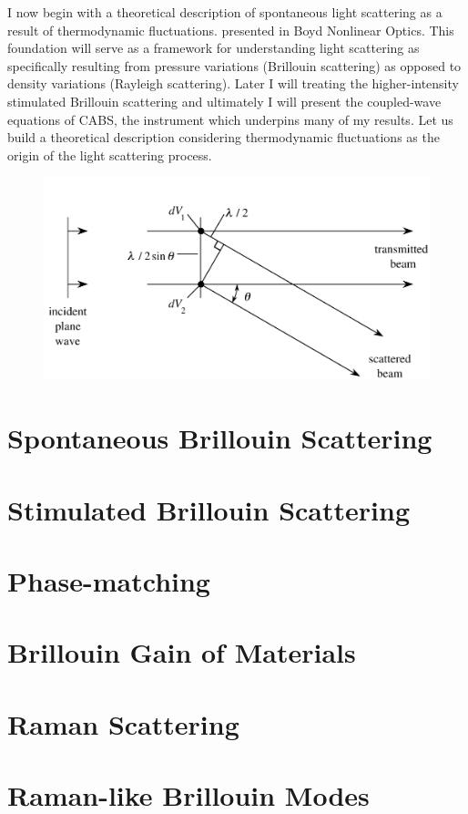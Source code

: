 I now begin with a theoretical description of spontaneous light scattering as a result of thermodynamic fluctuations.  presented in Boyd Nonlinear Optics.\cite{boyd2020nonlinear} This foundation will serve as a framework for understanding light scattering as specifically resulting from pressure variations (Brillouin scattering) as opposed to density variations (Rayleigh scattering). Later I will  treating the higher-intensity stimulated Brillouin scattering and ultimately I will present the coupled-wave equations of \ac{CABS}, the instrument which underpins many of my results. Let us build a theoretical description considering thermodynamic fluctuations as the origin of the light scattering process.

\begin{figure}[t] %
\centering
\includegraphics[width=0.75\linewidth]{figs/1-Intro/Boyd homogeneous material no scatter.png}
\caption{}
\label{fig:Introduction:homogeneous-material-no-scatter}
\end{figure}

\section{Spontaneous Brillouin Scattering}
\label{sec:Introduction:Spontaneous-Brillouin}
\lipsum[1]

\section{Stimulated Brillouin Scattering}
\label{sec:Introduction:Stimulated}
\lipsum[1]

\section{Phase-matching}
\label{sec:Introduction:Phase-matching}
\lipsum[1]

\section{Brillouin Gain of Materials}
\label{subsec:Introduction:Gain}
\lipsum[1]

\section{Raman Scattering}
\label{sec:Introduction:Raman}
\lipsum[1]

\section{Raman-like Brillouin Modes}
\label{sec:Introduction:Raman-like}
\lipsum[1]
